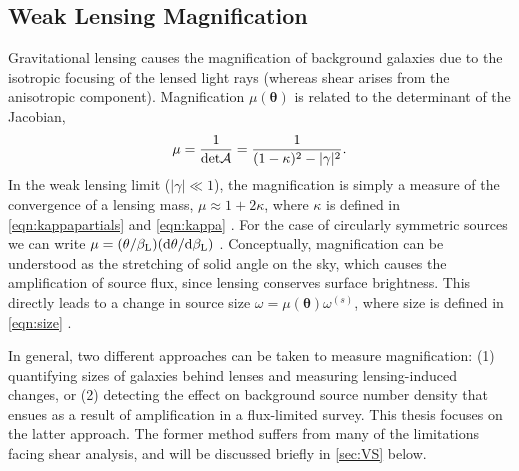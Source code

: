 
\subsection{Weak Lensing Magnification}
\label{sec:Mag}

Gravitational lensing causes the magnification of background galaxies due to the isotropic focusing of the lensed light rays (whereas shear arises from the anisotropic component). Magnification $\mu(\bm{\theta})$ is related to the determinant of the Jacobian, 
\begin{equation}
\mu  = \frac{1}{{\rm det}{\cal A}} = \frac{1}{(1-\kappa)^2 - |\gamma|^2}.
\end{equation}
In the weak lensing limit ($|\gamma| \ll 1$), the magnification is simply a measure of the convergence of a lensing mass, $\mu \approx 1+2\kappa$, where $\kappa$ is defined in \autoref{eqn:kappapartials} and \autoref{eqn:kappa} \citep{Schneider06_IntroGravLensCosmology}. For the case of circularly symmetric sources we can write $\mu = (\theta/\beta_{\rm L})({\rm d}\theta/{\rm d}\beta_{\rm L})$
\citep{NarayanBartelmann96}. Conceptually, magnification can be understood as the stretching of solid angle on the sky, which causes the amplification of source flux, since lensing conserves surface brightness. This directly leads to a change in source size $\omega = \mu(\bm{\theta}) \omega^{(s)}$, where size is defined in \autoref{eqn:size} \citep{BS01}.

In general, two different approaches can be taken to measure magnification: (1) quantifying sizes of galaxies behind lenses and measuring lensing-induced changes, or (2) detecting the effect on background source number density that ensues as a result of amplification in a flux-limited survey. This thesis focuses on the latter approach. The former method suffers from many of the limitations facing shear analysis, and will be discussed briefly in \autoref{sec:VS} below. 

